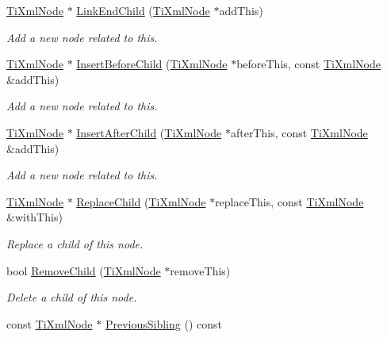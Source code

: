 \begin{DoxyCompactItemize}
\hyperlink{classTiXmlNode}{TiXmlNode} $\ast$ \hyperlink{classTiXmlNode_a1a881212554b759865f6cac79a851d38}{LinkEndChild} (\hyperlink{classTiXmlNode}{TiXmlNode} $\ast$addThis)
\begin{DoxyCompactList}\small\item\em Add a new node related to this. \item\end{DoxyCompactList}\item 
\hyperlink{classTiXmlNode}{TiXmlNode} $\ast$ \hyperlink{classTiXmlNode_a71e54e393336382bc9875f64aab5cb15}{InsertBeforeChild} (\hyperlink{classTiXmlNode}{TiXmlNode} $\ast$beforeThis, const \hyperlink{classTiXmlNode}{TiXmlNode} \&addThis)
\begin{DoxyCompactList}\small\item\em Add a new node related to this. \item\end{DoxyCompactList}\item 
\hyperlink{classTiXmlNode}{TiXmlNode} $\ast$ \hyperlink{classTiXmlNode_a274db3292218202805c093f66a964cb5}{InsertAfterChild} (\hyperlink{classTiXmlNode}{TiXmlNode} $\ast$afterThis, const \hyperlink{classTiXmlNode}{TiXmlNode} \&addThis)
\begin{DoxyCompactList}\small\item\em Add a new node related to this. \item\end{DoxyCompactList}\item 
\hyperlink{classTiXmlNode}{TiXmlNode} $\ast$ \hyperlink{classTiXmlNode_a543208c2c801c84a213529541e904b9f}{ReplaceChild} (\hyperlink{classTiXmlNode}{TiXmlNode} $\ast$replaceThis, const \hyperlink{classTiXmlNode}{TiXmlNode} \&withThis)
\begin{DoxyCompactList}\small\item\em Replace a child of this node. \item\end{DoxyCompactList}\item 
bool \hyperlink{classTiXmlNode_ae19d8510efc90596552f4feeac9a8fbf}{RemoveChild} (\hyperlink{classTiXmlNode}{TiXmlNode} $\ast$removeThis)
\begin{DoxyCompactList}\small\item\em Delete a child of this node. \item\end{DoxyCompactList}\item 
const \hyperlink{classTiXmlNode}{TiXmlNode} $\ast$ \hyperlink{classTiXmlNode_ac2cd892768726270e511b2ab32de4d10}{PreviousSibling} () const 

\end{DoxyCompactItemize}
